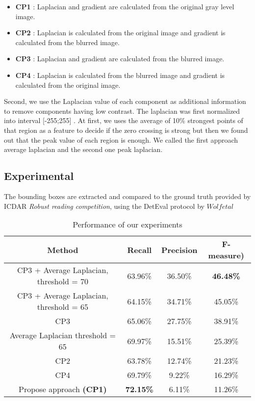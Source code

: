 \begin{itemize}
\item {\textbf{CP1}} : Laplacian and gradient are calculated from the original gray level image.
\item {\textbf{CP2}} : Laplacian is calculated from the original image and gradient is calculated from the blurred image.
\item {\textbf{CP3}} : Laplacian and gradient are calculated from the blurred image.
\item {\textbf{CP4}} : Laplacian is calculated from the blurred image and gradient is calculated from the original image.
\end{itemize}

Second, we use the Laplacian value of each component as additional information to remove components having low contrast. The laplacian was first normalized into interval [-255;255] . At first, we uses the average of 10\% strongest points of that region as a feature to decide if the zero crossing is strong but then we found out that the peak value of each region is enough. We called the first approach average laplacian and the second one peak laplacian.

\subsection{Experimental}
The bounding boxes are extracted and compared to the ground truth provided by ICDAR \textit{Robust reading competition}, using the DetEval protocol by $Wolf et al$ \cite{WolfIJDAR2006}

\begin {table}[H]
\caption{Performance of our experiments}\label{tab:performanceOur} 
\begin{tabular}{|c|c|c|c|}
\hline 
\textbf{Method} & \textbf{Recall} & \textbf{Precision} & \textbf{F-measure)} \\ 
\hline 
CP3 + Average Laplacian, threshold = 70 & 63.96\% & 36.50\% & \textbf{46.48\%} \\ 
\hline 
CP3 + Average Laplacian, threshold = 65  & 64.15\% & 34.71\% & 45.05\%\\ 
\hline 
CP3 & 65.06\% & 27.75\% & 38.91\% \\ 
\hline
Average Laplacian threshold = 65  & 69.97\% & 15.51\% & 25.39\% \\ 
\hline  
CP2 & 63.78\% & 12.74\% & 21.23\% \\ 
\hline 
CP4 & 69.79\% & 9.22\% & 16.29\% \\ 
\hline 
Propose approach \textbf{(CP1)} &\textbf{ 72.15\%} & 6.11\% & 11.26\% \\ 
\hline 
\end{tabular} 

\end{table}

